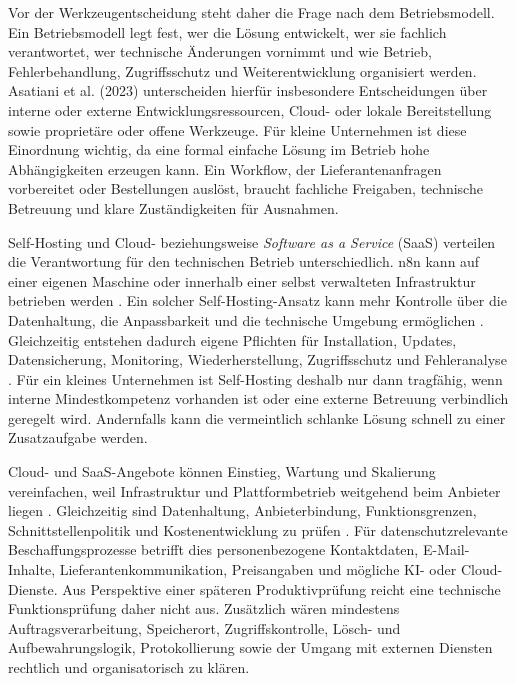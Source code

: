 \documentclass[a4paper,12pt]{article}
\begin{document}
Vor der Werkzeugentscheidung steht daher die Frage nach dem Betriebsmodell. Ein Betriebsmodell legt fest, wer die Lösung entwickelt, wer sie fachlich verantwortet, wer technische Änderungen vornimmt und wie Betrieb, Fehlerbehandlung, Zugriffsschutz und Weiterentwicklung organisiert werden. Asatiani et al. (2023) unterscheiden hierfür insbesondere Entscheidungen über interne oder externe Entwicklungsressourcen, Cloud- oder lokale Bereitstellung sowie proprietäre oder offene Werkzeuge. Für kleine Unternehmen ist diese Einordnung wichtig, da eine formal einfache Lösung im Betrieb hohe Abhängigkeiten erzeugen kann. Ein Workflow, der Lieferantenanfragen vorbereitet oder Bestellungen auslöst, braucht fachliche Freigaben, technische Betreuung und klare Zuständigkeiten für Ausnahmen.

Self-Hosting und Cloud- beziehungsweise \textit{Software as a Service} (SaaS) verteilen die Verantwortung für den technischen Betrieb unterschiedlich. n8n kann auf einer eigenen Maschine oder innerhalb einer selbst verwalteten Infrastruktur betrieben werden \parencite{n8n_docs_2026}. Ein solcher Self-Hosting-Ansatz kann mehr Kontrolle über die Datenhaltung, die Anpassbarkeit und die technische Umgebung ermöglichen \parencite{edjekoomhene_entwicklung_2024,n8n_docs_2026}. Gleichzeitig entstehen dadurch eigene Pflichten für Installation, Updates, Datensicherung, Monitoring, Wiederherstellung, Zugriffsschutz und Fehleranalyse \parencite{n8n_docs_2026}. Für ein kleines Unternehmen ist Self-Hosting deshalb nur dann tragfähig, wenn interne Mindestkompetenz vorhanden ist oder eine externe Betreuung verbindlich geregelt wird. Andernfalls kann die vermeintlich schlanke Lösung schnell zu einer Zusatzaufgabe werden.

Cloud- und SaaS-Angebote können Einstieg, Wartung und Skalierung vereinfachen, weil Infrastruktur und Plattformbetrieb weitgehend beim Anbieter liegen \parencite{asatiani_deciding_2023,oecd_digital_2021}. Gleichzeitig sind Datenhaltung, Anbieterbindung, Funktionsgrenzen, Schnittstellenpolitik und Kostenentwicklung zu prüfen \parencite{asatiani_deciding_2023,oecd_digital_2021}. Für datenschutzrelevante Beschaffungsprozesse betrifft dies personenbezogene Kontaktdaten, E-Mail-Inhalte, Lieferantenkommunikation, Preisangaben und mögliche KI- oder Cloud-Dienste. Aus Perspektive einer späteren Produktivprüfung reicht eine technische Funktionsprüfung daher nicht aus. Zusätzlich wären mindestens Auftragsverarbeitung, Speicherort, Zugriffskontrolle, Lösch- und Aufbewahrungslogik, Protokollierung sowie der Umgang mit externen Diensten rechtlich und organisatorisch zu klären.
\end{document}
